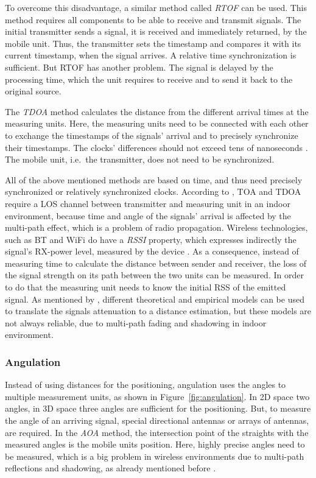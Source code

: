 To overcome this disadvantage, a similar method called \emph{\ac{RTOF}} can be used. This method requires all components to be able to receive and transmit signals. The initial transmitter sends a signal, it is received and immediately returned, by the mobile unit. Thus, the transmitter sets the timestamp and compares it with its current timestamp, when the signal arrives. A relative time synchronization is sufficient. But \ac{RTOF} has another problem. The signal is delayed by the processing time, which the unit requires to receive and to send it back to the original source.

The \emph{\ac{TDOA}} method calculates the distance from the different arrival times at the measuring units. Here, the measuring units need to be connected with each other to exchange the timestamps of the signals' arrival and to precisely synchronize their timestamps. The clocks' differences should not exceed tens of nanoseconds \citep{kotanen:exp_local_pos_bt}. The mobile unit, i.e.\ the transmitter, does not need to be synchronized. 

All of the above mentioned methods are based on time, and thus need precisely synchronized or relatively synchronized clocks. According to \citet{IEEE:survey_wireless_indoor_pos}, \ac{TOA} and \ac{TDOA} require a \ac{LOS} channel between transmitter and measuring unit in an indoor environment, because time and angle of the signals' arrival is affected by the multi-path effect, which is a problem of radio propagation. Wireless technologies, such as \acl{BT} and WiFi do have a \emph{\ac{RSSI}} property, which expresses indirectly the signal's \acs{RX}-power level, measured by the device \citep{kotanen:exp_local_pos_bt}. As a consequence, instead of measuring time to calculate the distance between sender and receiver, the loss of the signal strength on its path between the two units can be measured. In order to do that the measuring unit needs to know the initial \ac{RSS} of the emitted signal. As mentioned by \citet{IEEE:survey_wireless_indoor_pos}, different theoretical and empirical models can be used to translate the signals attenuation to a distance estimation, but these models are not always reliable, due to multi-path fading and shadowing in indoor environment.

\subsubsection*{Angulation}
Instead of using distances for the positioning, angulation uses the angles to multiple measurement units, as shown in Figure~\ref{fig:angulation}. In 2D space two angles, in 3D space three angles are sufficient for the positioning. But, to measure the angle of an arriving signal, special directional antennas or arrays of antennas, are required. In the \emph{\ac{AOA}} method, the intersection point of the straights with the measured angles is the mobile units position. Here, highly precise angles need to be measured, which is a big problem in wireless environments due to multi-path reflections and shadowing, as already mentioned before \citep{IEEE:survey_wireless_indoor_pos, wang:bt_pos}.

